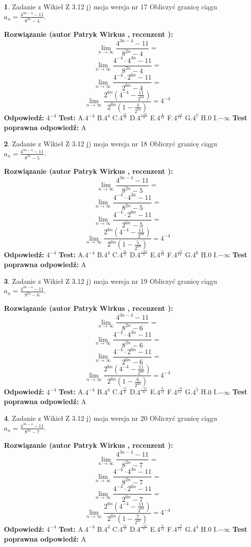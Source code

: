 \documentclass[12pt, a4paper]{article}
\theoremstyle{definition} %
\newtheorem{zad}{}
\newcommand{\zadStart}[1]{\begin{zad}#1\newline}
\newcommand{\zadStop}{\end{zad}}
\newcommand{\rozwStart}[2]{\noindent \textbf{Rozwiązanie (autor #1 , recenzent #2): }\newline}
\newcommand{\rozwStop}{\newline}
\newcommand{\odpStart}{\noindent \textbf{Odpowiedź:}\newline}
\newcommand{\odpStop}{\newline}
\newcommand{\testStart}{\noindent \textbf{Test:}\newline}
\newcommand{\testStop}{\newline}
\newcommand{\kluczStart}{\noindent \textbf{Test poprawna odpowiedź:}\newline}
\newcommand{\kluczStop}{\newline}
\begin{document}
\zadStart{Zadanie z Wikieł Z 3.12 j) moja wersja nr 17}
Obliczyć granicę ciągu $a_{n}=\frac{4^{3n-4}-11}{8^{2n}-4}$.
\zadStop
\rozwStart{Patryk Wirkus}{}
$$\lim\limits_{n\to\infty}\frac{4^{3n-4}-11}{8^{2n}-4}=$$
$$\lim\limits_{n\to\infty}\frac{4^{-4} \cdot 4^{3n}-11}{8^{2n}-4}=$$
$$\lim\limits_{n\to\infty}\frac{4^{-4} \cdot 2^{6n}-11}{2^{6n}-4}=$$
$$\lim\limits_{n\to\infty}\frac{2^{6n}(4^{-4} - \frac{11}{2^{6n}})}{2^{6n}(1-\frac{4}{2^{6n}})}= 4^{-4}$$
\rozwStop
\odpStart
$4^{-4}$
\odpStop
\testStart
A.$4^{-4}$
B.$4^{4}$
C.$4^{\frac{11}{4}}$
D.$4^{\frac{-11}{4}}$
E.$4^{\frac{4}{11}}$
F.$4^{\frac{-4}{11}}$
G.$4^{7}$
H.$0$
I.$-\infty$
\testStop
\kluczStart
A
\kluczStop



\zadStart{Zadanie z Wikieł Z 3.12 j) moja wersja nr 18}
Obliczyć granicę ciągu $a_{n}=\frac{4^{3n-4}-11}{8^{2n}-5}$.
\zadStop
\rozwStart{Patryk Wirkus}{}
$$\lim\limits_{n\to\infty}\frac{4^{3n-4}-11}{8^{2n}-5}=$$
$$\lim\limits_{n\to\infty}\frac{4^{-4} \cdot 4^{3n}-11}{8^{2n}-5}=$$
$$\lim\limits_{n\to\infty}\frac{4^{-4} \cdot 2^{6n}-11}{2^{6n}-5}=$$
$$\lim\limits_{n\to\infty}\frac{2^{6n}(4^{-4} - \frac{11}{2^{6n}})}{2^{6n}(1-\frac{5}{2^{6n}})}= 4^{-4}$$
\rozwStop
\odpStart
$4^{-4}$
\odpStop
\testStart
A.$4^{-4}$
B.$4^{4}$
C.$4^{\frac{11}{5}}$
D.$4^{\frac{-11}{5}}$
E.$4^{\frac{5}{11}}$
F.$4^{\frac{-5}{11}}$
G.$4^{6}$
H.$0$
I.$-\infty$
\testStop
\kluczStart
A
\kluczStop



\zadStart{Zadanie z Wikieł Z 3.12 j) moja wersja nr 19}
Obliczyć granicę ciągu $a_{n}=\frac{4^{3n-4}-11}{8^{2n}-6}$.
\zadStop
\rozwStart{Patryk Wirkus}{}
$$\lim\limits_{n\to\infty}\frac{4^{3n-4}-11}{8^{2n}-6}=$$
$$\lim\limits_{n\to\infty}\frac{4^{-4} \cdot 4^{3n}-11}{8^{2n}-6}=$$
$$\lim\limits_{n\to\infty}\frac{4^{-4} \cdot 2^{6n}-11}{2^{6n}-6}=$$
$$\lim\limits_{n\to\infty}\frac{2^{6n}(4^{-4} - \frac{11}{2^{6n}})}{2^{6n}(1-\frac{6}{2^{6n}})}= 4^{-4}$$
\rozwStop
\odpStart
$4^{-4}$
\odpStop
\testStart
A.$4^{-4}$
B.$4^{4}$
C.$4^{\frac{11}{6}}$
D.$4^{\frac{-11}{6}}$
E.$4^{\frac{6}{11}}$
F.$4^{\frac{-6}{11}}$
G.$4^{5}$
H.$0$
I.$-\infty$
\testStop
\kluczStart
A
\kluczStop



\zadStart{Zadanie z Wikieł Z 3.12 j) moja wersja nr 20}
Obliczyć granicę ciągu $a_{n}=\frac{4^{3n-4}-11}{8^{2n}-7}$.
\zadStop
\rozwStart{Patryk Wirkus}{}
$$\lim\limits_{n\to\infty}\frac{4^{3n-4}-11}{8^{2n}-7}=$$
$$\lim\limits_{n\to\infty}\frac{4^{-4} \cdot 4^{3n}-11}{8^{2n}-7}=$$
$$\lim\limits_{n\to\infty}\frac{4^{-4} \cdot 2^{6n}-11}{2^{6n}-7}=$$
$$\lim\limits_{n\to\infty}\frac{2^{6n}(4^{-4} - \frac{11}{2^{6n}})}{2^{6n}(1-\frac{7}{2^{6n}})}= 4^{-4}$$
\rozwStop
\odpStart
$4^{-4}$
\odpStop
\testStart
A.$4^{-4}$
B.$4^{4}$
C.$4^{\frac{11}{7}}$
D.$4^{\frac{-11}{7}}$
E.$4^{\frac{7}{11}}$
F.$4^{\frac{-7}{11}}$
G.$4^{4}$
H.$0$
I.$-\infty$
\testStop
\kluczStart
A
\kluczStop
\end{document}
